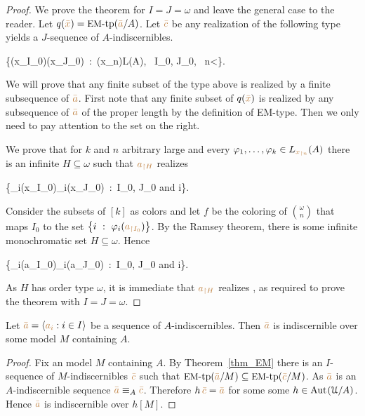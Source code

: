 \documentclass[creche.tex]{subfiles}
\begin{document}
\begin{proof}
We prove the theorem for $I=J=\omega$ and leave the general case to the reader.
Let $q({\color{brown}\bar x})=\textrm{{\small EM}\mbox{-}tp}({\color{brown}\bar a}/A)$.
Let ${\color{brown}\bar c}$ be any realization of the following type yields a $J$-sequence of $A$-indiscernibles.

{\cup}
{\Big\{\phi({\mr x_{\restriction I_0}})\iff\phi({\mr x_{\restriction J_0}})\ :\  \phi({\mr x_{\restriction n}})\in L(A), \ I_0, J_0, \ n<\omega\Big\}.}

We will prove that any finite subset of the type above is realized by a finite subsequence of ${\color{brown}\bar a}$.
First note that any finite subset of $q({\color{brown}\bar x})$ is realized by any subsequence of ${\color{brown}\bar a}$ of the proper length by the definition of EM-type.
Then we only need to pay attention to the set on the right.

We prove that for $k$ and $n$ arbitrary large and every $\varphi_1,\dots,\varphi_k\in L_{\color{brown} x_{\restriction n}}(A)$ there is an infinite $H\subseteq\omega$ such that ${\color{brown} a_{\restriction H}}$ realizes

\ceq{\ssf{\#}}
{}
{\Big\{\phi_i({\mr x_{\restriction I_0}})\iff\phi_i({\mr x_{\restriction J_0}})\ :\  I_0, J_0\textrm{ and } i\in[k]\Big\}.}

Consider the subsets of $[k]$ as colors and let $f$ be the coloring of ${\omega\choose n}$ that maps $I_0$ to the set $\big\{i\ :\ \varphi_i({\color{brown} a_{\restriction I_0}})\big\}$.
By the Ramsey theorem,
there is some infinite monochromatic set $H\subseteq\omega$.
Hence

\ceq{}
{}
{\Big\{\phi_i({\mr a_{\restriction I_0}})\iff\phi_i({\mr a_{\restriction J_0}})\ :\  I_0, J_0\textrm{ and } i\in[k]\Big\}.}

As $H$ has order type $\omega$,
it is immediate that ${\color{brown} a_{\restriction H}}$ realizes \ssf{\#},
as required to prove the theorem with $I=J=\omega$.
\end{proof}


\begin{proposition}\label{prop_indiscernibles_set_model}
Let ${\color{brown}\bar a}=\langle{\color{brown}a_i}:i\in I\rangle$ be a sequence of $A$-indiscernibles.
Then ${\color{brown}\bar a}$ is indiscernible over some model $M$ containing $A$.
\end{proposition}

\begin{proof}
Fix an model $M$ containing $A$.
By Theorem~\ref{thm_EM} there is an $I$-sequence of $M$-indiscernibles ${\color{brown}\bar c}$ such that $\textrm{{\small EM}\mbox{-}tp}({\color{brown}\bar a}/M)\subseteq\textrm{{\small EM}\mbox{-}tp}({\color{brown}\bar c}/M)$.
As ${\color{brown}\bar a}$ is an $A$-indiscernible sequence ${\color{brown}\bar a}\equiv_A{\color{brown}\bar c}$.
Therefore $h\,{\color{brown}\bar c}={\color{brown}\bar a}$ for some some $h\in\textrm{Aut\kern.15ex}(\EuScript U/A)$.
Hence ${\color{brown}\bar a}$ is indiscernible over $h[M]$.
\end{proof}
\end{document}
